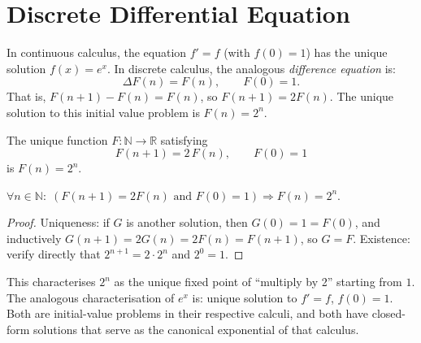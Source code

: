 \section*{Discrete Differential Equation}

In continuous calculus, the equation \(f' = f\) (with \(f(0) = 1\)) has the
unique solution \(f(x) = e^x\). In discrete calculus, the analogous
\emph{difference equation} is:
\[
\Delta F(n) = F(n), \qquad F(0) = 1.
\]
That is, \(F(n+1) - F(n) = F(n)\), so \(F(n+1) = 2F(n)\). The unique solution
to this initial value problem is \(F(n) = 2^n\).

\begin{proposition}
\label{prop:discrete-ivp}
The unique function \(F : \mathbb{N} \to \mathbb{R}\) satisfying
\[
F(n+1) = 2\,F(n), \qquad F(0) = 1
\]
is \(F(n) = 2^n\).
\end{proposition}

\begin{remark*}
\(\forall n \in \mathbb{N}:\;
(F(n+1) = 2F(n)\text{ and }F(0)=1) \Rightarrow F(n) = 2^n\).
\end{remark*}

\begin{proof}
Uniqueness: if \(G\) is another solution, then \(G(0) = 1 = F(0)\), and
inductively \(G(n+1) = 2G(n) = 2F(n) = F(n+1)\), so \(G = F\).
Existence: verify directly that \(2^{n+1} = 2\cdot 2^n\) and \(2^0 = 1\).
\end{proof}

\begin{remark*}[Significance]
This characterises \(2^n\) as the unique fixed point of ``multiply by 2''
starting from \(1\). The analogous characterisation of \(e^x\) is: unique
solution to \(f' = f\), \(f(0) = 1\). Both are initial-value problems in
their respective calculi, and both have closed-form solutions that serve as
the canonical exponential of that calculus.
\end{remark*}

